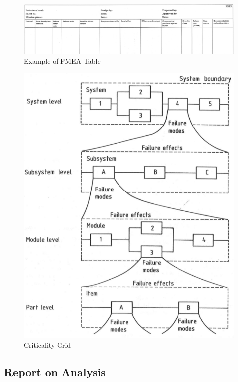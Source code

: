 \documentclass[./dissertation.tex]{subfiles}
\begin{document}
\begin{figure}
        \includegraphics[width=\linewidth]{subfiles/imgs/FMEA_table.png}
  \caption{Example of FMEA Table}
        \label{fig:fmea_table}
\end{figure}


\begin{figure}
        \includegraphics[width=\linewidth]{subfiles/imgs/fmea_relationship_failure_mode_effects.png}
  \caption{Criticality Grid}
        \label{fig:criticality_grid}
\end{figure}


\subsection{Report on Analysis}
\end{document}
